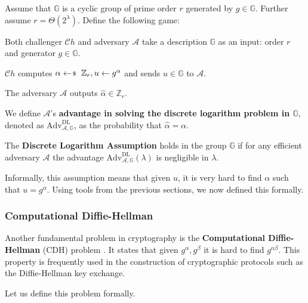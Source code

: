 \documentclass[../../book.tex]{subfiles}
\begin{document}
\begin{definition}\label{def:discrete-log}
    Assume that $\mathbb{G}$ is a cyclic group of prime order $r$ generated by $g \in \mathbb{G}$. 
    Further assume $r=\Theta(2^{\lambda})$.
    Define the following game:
    \begin{algoen}
        \item Both challenger $\mathcal{C}h$ and adversary $\mathcal{A}$ take a description $\mathbb{G}$ as an 
        input: order $r$ and generator $g \in \mathbb{G}$.
        \item $\mathcal{C}h$ computes $\alpha \leftarrowS \mathbb{Z}_r, u \gets g^{\alpha}$ and sends 
        $u \in \mathbb{G}$ to $\mathcal{A}$.
        \item The adversary $\mathcal{A}$ outputs $\widehat{\alpha} \in \mathbb{Z}_r$.
    \end{algoen}

    We define $\mathcal{A}$'s \textbf{advantage in solving the discrete logarithm problem in $\mathbb{G}$}, 
    denoted as $\text{Adv}^{\text{DL}}_{\mathcal{A},\mathbb{G}}$, as the probability that $\widehat{\alpha} = \alpha$.
\end{definition}

\begin{definition}
    The \textbf{Discrete Logarithm Assumption} holds in the group $\mathbb{G}$ 
    if for any efficient adversary $\mathcal{A}$ the advantage $\text{Adv}^{\text{DL}}_{\mathcal{A},\mathbb{G}}(\lambda)$ 
    is negligible in $\lambda$.
\end{definition}

Informally, this assumption means that given $u$, it is very hard to find $\alpha$ such that $u = g^{\alpha}$. 
Using tools from the previous sections, we now defined this formally.

\subsubsection{Computational Diffie-Hellman}

Another fundamental problem in cryptography is the \textbf{Computational Diffie-Hellman} (CDH) problem \cite[chapter 16]{Dan_Boneh_2023}. 
It states that given $g^{\alpha},g^{\beta}$ it is hard to find $g^{\alpha\beta}$. This property is frequently used 
in the construction of cryptographic protocols such as the Diffie-Hellman key exchange.

Let us define this problem formally.
\end{document}
